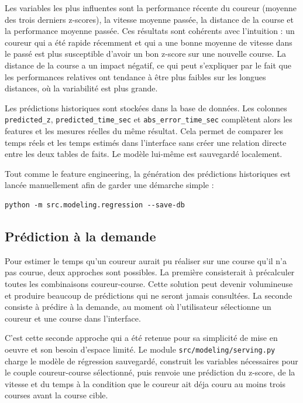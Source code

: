 \documentclass[12pt,a4paper]{article}
\begin{document}
Les variables les plus influentes sont la performance récente du coureur (moyenne des trois derniers z-scores), la vitesse moyenne passée, la distance de la course et la performance moyenne passée. Ces résultats sont cohérents avec l'intuition : un coureur qui a été rapide récemment et qui a une bonne moyenne de vitesse dans le passé est plus susceptible d'avoir un bon z-score sur une nouvelle course. La distance de la course a un impact négatif, ce qui peut s'expliquer par le fait que les performances relatives ont tendance à être plus faibles sur les longues distances, où la variabilité est plus grande.

Les prédictions historiques sont stockées dans la base de données. Les colonnes \texttt{predicted\_z}, \texttt{predicted\_time\_sec} et \texttt{abs\_error\_time\_sec} complètent alors les features et les mesures réelles du même résultat. Cela permet de comparer les temps réels et les temps estimés dans l'interface sans créer une relation directe entre les deux tables de faits. Le modèle lui-même est sauvegardé localement.

Tout comme le feature engineering, la génération des prédictions historiques est lancée manuellement afin de garder une démarche simple :

\begin{verbatim}
python -m src.modeling.regression --save-db
\end{verbatim}

\subsection{Prédiction à la demande}

Pour estimer le temps qu'un coureur aurait pu réaliser sur une course qu'il n'a pas courue, deux approches sont possibles. La première consisterait à précalculer toutes les combinaisons coureur-course. Cette solution peut devenir volumineuse et produire beaucoup de prédictions qui ne seront jamais consultées. La seconde consiste à prédire à la demande, au moment où l'utilisateur sélectionne un coureur et une course dans l'interface.

C'est cette seconde approche qui a été retenue pour sa simplicité de mise en oeuvre et son besoin d'espace limité. Le module \texttt{src/modeling/serving.py} charge le modèle de régression sauvegardé, construit les variables nécessaires pour le couple coureur-course sélectionné, puis renvoie une prédiction du z-score, de la vitesse et du temps à la condition que le coureur ait déja couru au moins trois courses avant la course cible.
\end{document}
